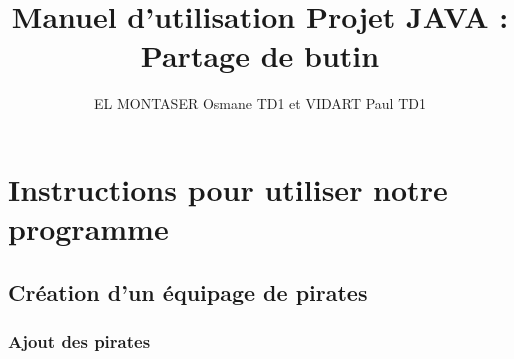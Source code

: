 \documentclass[12pt]{article}
\title{Manuel d'utilisation Projet JAVA : Partage de butin}
\author{EL MONTASER Osmane TD1 et VIDART Paul TD1}
\date{}
\begin{document}
\begin{titlepage}
\maketitle
\end{titlepage}

\renewcommand*\contentsname{Sommaire}
\tableofcontents
\pagebreak

\section{Instructions pour utiliser notre programme}
\subsection{Création d'un équipage de pirates}


\subsubsection{Ajout des pirates}
\end{document}
